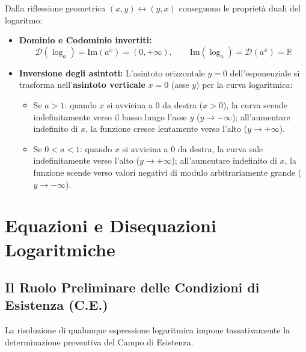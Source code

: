 \documentclass[11pt,a4paper,oneside]{report}
\begin{document}
Dalla riflessione geometrica $(x, y) \longleftrightarrow (y, x)$ conseguono le proprietà duali del logaritmo:
\begin{itemize}
    \item \textbf{Dominio e Codominio invertiti:}
    \begin{equation}
        \mathcal{D}(\log_a) = \mathrm{Im}(a^x) = (0, +\infty), \qquad \mathrm{Im}(\log_a) = \mathcal{D}(a^x) = \mathbb{R}
    \end{equation}
    \item \textbf{Inversione degli asintoti:} L'asintoto orizzontale $y = 0$ dell'esponenziale si trasforma nell'\textbf{asintoto verticale} $x = 0$ (asse $y$) per la curva logaritmica:
    \begin{itemize}
        \item Se $a > 1$: quando $x$ si avvicina a $0$ da destra ($x > 0$), la curva scende indefinitamente verso il basso lungo l'asse $y$ ($y \to -\infty$); all'aumentare indefinito di $x$, la funzione cresce lentamente verso l'alto ($y \to +\infty$).
        \item Se $0 < a < 1$: quando $x$ si avvicina a $0$ da destra, la curva sale indefinitamente verso l'alto ($y \to +\infty$); all'aumentare indefinito di $x$, la funzione scende verso valori negativi di modulo arbitrariamente grande ($y \to -\infty$).
    \end{itemize}
\end{itemize}

\newpage

\chapter{Equazioni e Disequazioni Logaritmiche}

\section{Il Ruolo Preliminare delle Condizioni di Esistenza (C.E.)}
La risoluzione di qualunque espressione logaritmica impone tassativamente la determinazione preventiva del Campo di Esistenza.
\end{document}
